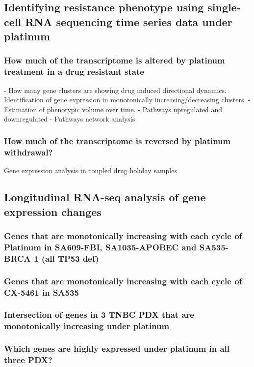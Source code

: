 \documentclass{nature}
\begin{document}
\subsection{Identifying resistance phenotype using single-cell RNA sequencing time series data under platinum}

\subsubsection{How much of the transcriptome is altered by platinum treatment in a drug resistant state}
- How many gene clusters are showing drug induced directional dynamics.
Identification of gene expression in monotonically increasing/decreasing clusters.
- Estimation of phenotypic volume over time.
- Pathways upregulated and downregulated
- Pathways network analysis
\subsubsection{How much of the transcriptome is reversed by platinum withdrawal?}
Gene expression analysis in coupled drug holiday samples

\subsection{Longitudinal RNA-seq analysis of gene expression changes}


\subsubsection{Genes that are monotonically increasing with each cycle of Platinum in SA609-FBI, SA1035-APOBEC and SA535- BRCA 1 (all TP53 def)}

\subsubsection{Genes that are monotonically increasing with each cycle of CX-5461 in SA535}


\subsubsection{Intersection of genes in 3 TNBC PDX that are monotonically increasing under platinum}


\subsubsection{Which genes are highly expressed under platinum in all three PDX?}
\end{document}
